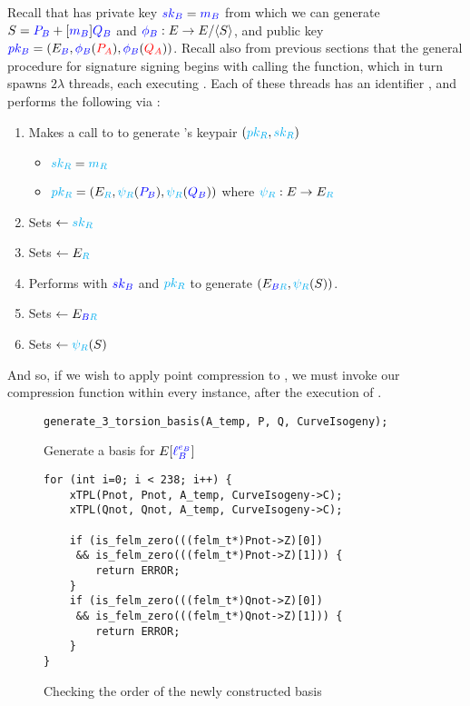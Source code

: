 Recall that \bob has private key $\textcolor{blue}{sk_B} = \textcolor{blue}{m_B}$ from which we can generate $S = \textcolor{blue}{P_B} + [\textcolor{blue}{m_B}]\textcolor{blue}{Q_B}$ and $\textcolor{blue}{\phi_B}: E \rightarrow E/\langle S \rangle$, and public key $\textcolor{blue}{pk_B} = (E_{\textcolor{blue}{B}}, \textcolor{blue}{\phi_B}(\textcolor{red}{P_A}), \textcolor{blue}{\phi_B}(\textcolor{red}{Q_A}))$. Recall also from previous sections that the general procedure for signature signing begins with \bob calling the  function, which in turn spawns $2\lambda$ threads, each executing . Each of these threads has an identifier , and performs the following via :
\begin{enumerate}
\item Makes a call to  to generate \randall's keypair $(\textcolor{cyan}{pk_R}, \textcolor{cyan}{sk_R})$
\begin{itemize}
\item $\textcolor{cyan}{sk_R} = \textcolor{cyan}{m_R}$
\item $\textcolor{cyan}{pk_R} = (E_{\textcolor{cyan}{R}}, \textcolor{cyan}{\psi_R}(\textcolor{blue}{P_B}), \textcolor{cyan}{\psi_R}(\textcolor{blue}{Q_B}))$ where $\textcolor{cyan}{\psi_R}: E \rightarrow E_{\textcolor{cyan}{R}}$
\end{itemize}
\item Sets  $\gets \textcolor{cyan}{sk_R}$
\item Sets  $\gets E_{\textcolor{cyan}{R}}$
\item Performs  with $\textcolor{blue}{sk_B}$ and $\textcolor{cyan}{pk_R}$ to generate $(E_{\textcolor{blue}{B}\textcolor{cyan}{R}}, \textcolor{cyan}{\psi_R}(S))$.
\item Sets  $\gets E_{\textcolor{blue}{B}\textcolor{cyan}{R}}$
\item Sets  $\gets \textcolor{cyan}{\psi_R}(S)$
\end{enumerate}

And so, if we wish to apply point compression to , we must invoke our compression function within every  instance, after the execution of . 

\begin{figure}[!h]
\begin{lstlisting}
generate_3_torsion_basis(A_temp, P, Q, CurveIsogeny);
\end{lstlisting}
\caption{Generate a basis for $E[\textcolor{blue}{\ell_{B}^{e_B}}]$}
\label{code:sigstruct}
\end{figure}

\begin{figure}[!h]
\begin{lstlisting}
for (int i=0; i < 238; i++) {
	xTPL(Pnot, Pnot, A_temp, CurveIsogeny->C);
	xTPL(Qnot, Qnot, A_temp, CurveIsogeny->C);

	if (is_felm_zero(((felm_t*)Pnot->Z)[0]) 
	 && is_felm_zero(((felm_t*)Pnot->Z)[1])) {
		return ERROR;
	}
	if (is_felm_zero(((felm_t*)Qnot->Z)[0]) 
	 && is_felm_zero(((felm_t*)Qnot->Z)[1])) {
		return ERROR;
	}
}
\end{lstlisting}
\caption{Checking the order of the newly constructed basis}
\label{code:checkorder}
\end{figure}


